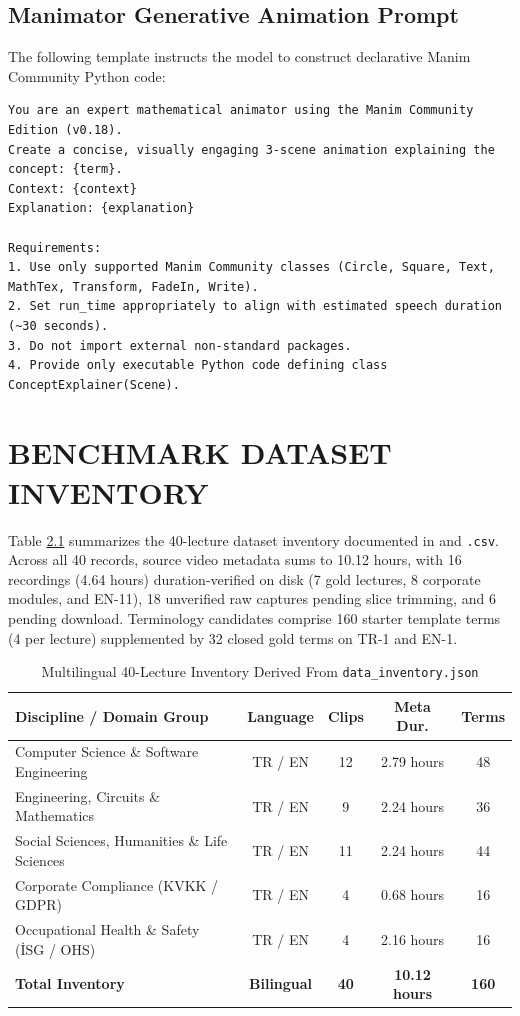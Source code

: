 \documentclass[a4paper,12pt]{report}
\begin{document}
\section{Manimator Generative Animation Prompt}
The following template instructs the model to construct declarative Manim Community Python code:

\begin{lstlisting}
You are an expert mathematical animator using the Manim Community Edition (v0.18).
Create a concise, visually engaging 3-scene animation explaining the concept: {term}.
Context: {context}
Explanation: {explanation}

Requirements:
1. Use only supported Manim Community classes (Circle, Square, Text, MathTex, Transform, FadeIn, Write).
2. Set run_time appropriately to align with estimated speech duration (~30 seconds).
3. Do not import external non-standard packages.
4. Provide only executable Python code defining class ConceptExplainer(Scene).
\end{lstlisting}


\chapter{BENCHMARK DATASET INVENTORY}
\label{app:dataset}

Table \ref{table:dataset_summary} summarizes the 40-lecture dataset inventory documented in  and \texttt{.csv}. Across all 40 records, source video metadata sums to 10.12 hours, with 16 recordings (4.64 hours) duration-verified on disk (7 gold lectures, 8 corporate modules, and EN-11), 18 unverified raw captures pending slice trimming, and 6 pending download. Terminology candidates comprise 160 starter template terms (4 per lecture) supplemented by 32 closed gold terms on TR-1 and EN-1.

\begin{table}[h!]
\centering
\caption{Multilingual 40-Lecture Inventory Derived From \texttt{data\_inventory.json}}
\label{table:dataset_summary}
\baselineskip
\footnotesize
\setlength{\tabcolsep}{4pt}
\begin{tabular}{|p{7.2cm}|c|c|c|c|}
\hline
\textbf{Discipline / Domain Group} & \textbf{Language} & \textbf{Clips} & \textbf{Meta Dur.} & \textbf{Terms} \\ \hline
Computer Science \& Software Engineering & TR / EN & 12 & 2.79 hours & 48 \\ \hline
Engineering, Circuits \& Mathematics & TR / EN & 9 & 2.24 hours & 36 \\ \hline
Social Sciences, Humanities \& Life Sciences & TR / EN & 11 & 2.24 hours & 44 \\ \hline
Corporate Compliance (KVKK / GDPR) & TR / EN & 4 & 0.68 hours & 16 \\ \hline
Occupational Health \& Safety (İSG / OHS) & TR / EN & 4 & 2.16 hours & 16 \\ \hline
\textbf{Total Inventory} & \textbf{Bilingual} & \textbf{40} & \textbf{10.12 hours} & \textbf{160} \\ \hline
\end{tabular}
\end{table}
\end{document}

